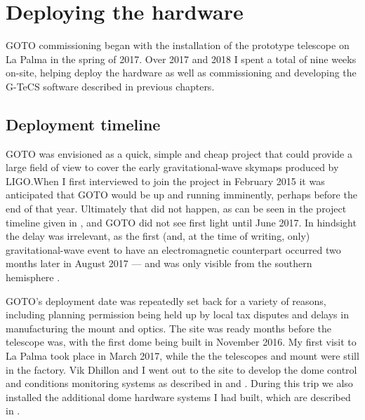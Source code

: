 \section{Deploying the hardware}
\label{sec:hardware_commissioning}
\begin{colsection}


\begin{colsection}

GOTO commissioning began with the installation of the prototype telescope on La Palma in the spring of 2017. Over 2017 and 2018 I spent a total of nine weeks on-site, helping deploy the hardware as well as commissioning and developing the G-TeCS software described in previous chapters.

\end{colsection}


\subsection{Deployment timeline}
\label{sec:timeline}
\begin{colsection}

GOTO was envisioned as a quick, simple and cheap project that could provide a large field of view to cover the early gravitational-wave skymaps produced by LIGO.\@ When I first interviewed to join the project in February 2015 it was anticipated that GOTO would be up and running imminently, perhaps before the end of that year. Ultimately that did not happen, as can be seen in the project timeline given in , and GOTO did not see first light until June 2017. In hindsight the delay was irrelevant, as the first (and, at the time of writing, only) gravitational-wave event to have an electromagnetic counterpart occurred two months later in August 2017 --- and was only visible from the southern hemisphere \citep{GW170817,GW170817_followup}.

GOTO's deployment date was repeatedly set back for a variety of reasons, including planning permission being held up by local tax disputes and delays in manufacturing the mount and optics. The site was ready months before the telescope was, with the first dome being built in November 2016. My first visit to La Palma took place in March 2017, while the the telescopes and mount were still in the factory. Vik Dhillon and I went out to the site to develop the dome control and conditions monitoring systems as described in  and . During this trip we also installed the additional dome hardware systems I had built, which are described in .


\end{colsection}
\end{colsection}
